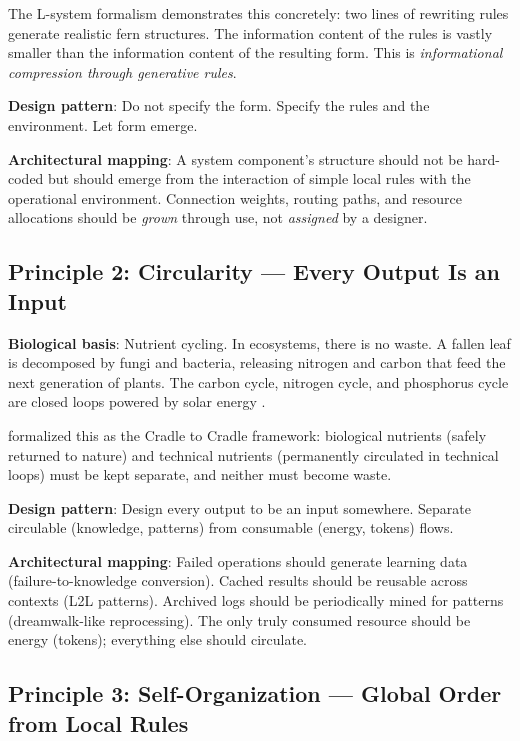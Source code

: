 \documentclass[11pt,a4paper]{article}
\begin{document}
The L-system formalism \citep{lindenmayer1968} demonstrates this concretely: two lines of rewriting rules generate realistic fern structures. The information content of the rules is vastly smaller than the information content of the resulting form. This is \emph{informational compression through generative rules}.

\textbf{Design pattern}: Do not specify the form. Specify the rules and the environment. Let form emerge.

\textbf{Architectural mapping}: A system component's structure should not be hard-coded but should emerge from the interaction of simple local rules with the operational environment. Connection weights, routing paths, and resource allocations should be \emph{grown} through use, not \emph{assigned} by a designer.

\subsection{Principle 2: Circularity --- Every Output Is an Input}

\textbf{Biological basis}: Nutrient cycling. In ecosystems, there is no waste. A fallen leaf is decomposed by fungi and bacteria, releasing nitrogen and carbon that feed the next generation of plants. The carbon cycle, nitrogen cycle, and phosphorus cycle are closed loops powered by solar energy \citep{odum1969}.

\citet{braungart2002} formalized this as the Cradle to Cradle framework: biological nutrients (safely returned to nature) and technical nutrients (permanently circulated in technical loops) must be kept separate, and neither must become waste.

\textbf{Design pattern}: Design every output to be an input somewhere. Separate circulable (knowledge, patterns) from consumable (energy, tokens) flows.

\textbf{Architectural mapping}: Failed operations should generate learning data (failure-to-knowledge conversion). Cached results should be reusable across contexts (L2L patterns). Archived logs should be periodically mined for patterns (dreamwalk-like reprocessing). The only truly consumed resource should be energy (tokens); everything else should circulate.

\subsection{Principle 3: Self-Organization --- Global Order from Local Rules}
\end{document}
